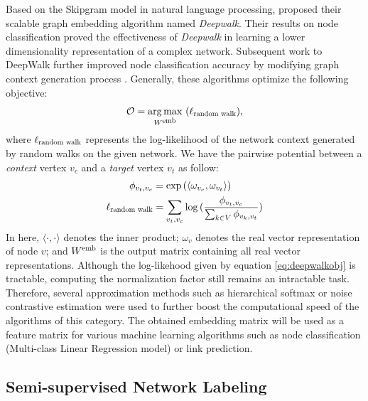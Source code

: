 \documentclass{article}
\DeclareMathOperator*{\argmax}{arg\,max}
\theoremstyle{definition}
\begin{document}
Based on the Skipgram model \cite{skipgram} in natural language 
processing, \citeauthor{deepwalk} proposed their scalable graph embedding 
algorithm named \emph{Deepwalk}. Their results on node classification proved the 
effectiveness of \emph{Deepwalk} in learning a lower dimensionality 
representation of a complex network. Subsequent work to DeepWalk further 
improved node classification accuracy by modifying graph context 
generation process \cite{line,grarep,planetoid,node2vec}. Generally, these
algorithms optimize the following objective:
\begin{equation} 
\mathcal{O} = \argmax_{W^{\scalebox{0.75}{emb}}}\ ( 
\ell_{\scalebox{0.75}{random walk}}),
\label{eq:deepwalkobj}
\end{equation}
where $\ell_{\scalebox{0.75}{random walk}}$ represents the log-likelihood
of the network context generated by random walks on the given network. We have
the pairwise potential between a \emph{context} vertex $v_c$ and a \emph{target}
vertex $v_t$ as follow:
\begin{equation}
\begin{aligned}
	\phi_{v_t,v_c} &= \exp{( \langle \omega_{v_c} ,  \omega_{v_t} \rangle )} \\
	\ell_{\scalebox{0.75}{random walk}} &= \sum_{v_t,v_c}
	\log{(\frac{\phi_{v_t,v_c}}{\sum_{k \in V} \phi_{v_k,v_t}})}
\end{aligned}
\label{eq:deepwalkprob}
\end{equation}
In here, $\langle \cdot , \cdot \rangle$ denotes the inner product; $\omega_v$ 
denotes the real vector representation of node $v$; and $W^{\scalebox{0.75}{emb}}$
is the output matrix containing all real vector representations. Although the 
log-likehood given by equation \ref{eq:deepwalkobj} is tractable, computing the
normalization factor still remains an intractable task. Therefore, several 
approximation methods such as hierarchical softmax \cite{deepwalk} or noise
contrastive estimation \cite{nce,node2vec} were used to further boost the
computational speed of the algorithms of this category. The obtained embedding
matrix will be used as a feature matrix for various machine learning algorithms
such as node classification (Multi-class Linear Regression model) or link 
prediction.

\subsection{Semi-supervised Network Labeling}
\end{document}

